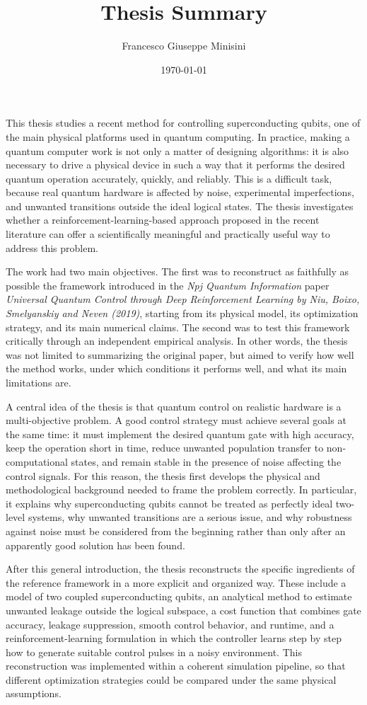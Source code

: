 \documentclass[11pt,a4paper]{article}
\title{Thesis Summary}
\author{Francesco Giuseppe Minisini}
\date{\today}
\begin{document}
\maketitle

\noindent
This thesis studies a recent method for controlling superconducting qubits, one of the main physical platforms used in quantum computing. In practice, making a quantum computer work is not only a matter of designing algorithms: it is also necessary to drive a physical device in such a way that it performs the desired quantum operation accurately, quickly, and reliably. This is a difficult task, because real quantum hardware is affected by noise, experimental imperfections, and unwanted transitions outside the ideal logical states. The thesis investigates whether a reinforcement-learning-based approach proposed in the recent literature can offer a scientifically meaningful and practically useful way to address this problem.

The work had two main objectives. The first was to reconstruct as faithfully as possible the framework introduced in the \emph{Npj Quantum Information} paper \emph{Universal Quantum Control through Deep Reinforcement Learning by Niu, Boixo, Smelyanskiy and Neven (2019)}, starting from its physical model, its optimization strategy, and its main numerical claims. The second was to test this framework critically through an independent empirical analysis. In other words, the thesis was not limited to summarizing the original paper, but aimed to verify how well the method works, under which conditions it performs well, and what its main limitations are.

A central idea of the thesis is that quantum control on realistic hardware is a multi-objective problem. A good control strategy must achieve several goals at the same time: it must implement the desired quantum gate with high accuracy, keep the operation short in time, reduce unwanted population transfer to non-computational states, and remain stable in the presence of noise affecting the control signals. For this reason, the thesis first develops the physical and methodological background needed to frame the problem correctly. In particular, it explains why superconducting qubits cannot be treated as perfectly ideal two-level systems, why unwanted transitions are a serious issue, and why robustness against noise must be considered from the beginning rather than only after an apparently good solution has been found.

After this general introduction, the thesis reconstructs the specific ingredients of the reference framework in a more explicit and organized way. These include a model of two coupled superconducting qubits, an analytical method to estimate unwanted leakage outside the logical subspace, a cost function that combines gate accuracy, leakage suppression, smooth control behavior, and runtime, and a reinforcement-learning formulation in which the controller learns step by step how to generate suitable control pulses in a noisy environment. This reconstruction was implemented within a coherent simulation pipeline, so that different optimization strategies could be compared under the same physical assumptions.
\end{document}
